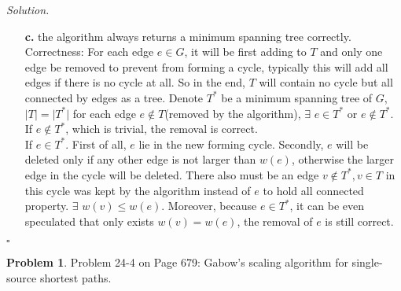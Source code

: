 \documentclass[11pt]{article}
\theoremstyle{definition}
\newtheorem{problem}{Problem}
\newenvironment{solution}{\noindent\emph{Solution.}}{\hfill$\square$}
\newcommand\tab[1][1cm]{\hspace*{#1}}
\begin{document}
\begin{solution}
\begin{enumerate}
 \item[\textbf{c.}] \tab the algorithm always returns a minimum spanning tree correctly.\\
 \tab Correctness: For each edge $e \in G$, it will be first adding to $T$ and only one edge be removed to prevent from forming a cycle, typically this will add all edges if there is no cycle at all. So in the end, $T$ will contain no cycle but all connected by edges as a tree. Denote $T^*$ be a minimum spanning tree of $G$, $\vert T \vert = \vert T^* \vert $ for each edge $e \notin T$(removed by the algorithm), $\exists$ $e \in T^*$ or $e \notin T^*$.\\
 \tab If $e \notin T^*$, which is trivial,  the removal is correct. \\
 \tab If $e \in T^*$. First of all, $e$ lie in the new forming cycle. Secondly, $e$ will be deleted only if any other edge is not larger than $w(e)$, otherwise the larger edge in the cycle will be deleted. There also must be an edge $v \notin T^*, v \in T$ in this cycle was kept by the algorithm instead of $e$ to hold all connected property. $\exists$ $w(v) \leq w(e)$. Moreover, because $e \in T^*$,  it can be even speculated that only exists $w(v) = w(e)$, the removal of $e$ is still correct.\\
   
   
  \end{enumerate}
\end{solution}

\clearpage






\begin{problem}
Problem 24-4 on Page 679: Gabow’s scaling algorithm for single-source shortest paths.
\end{problem}
\end{document}
